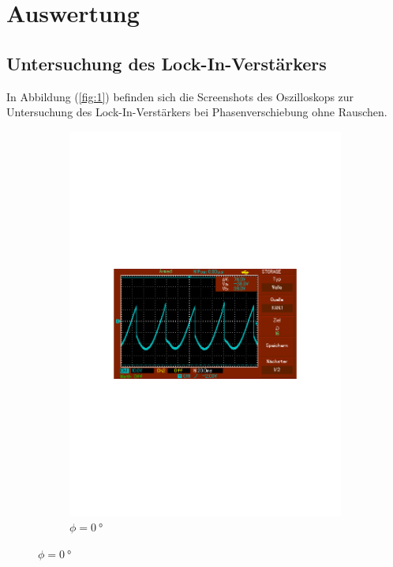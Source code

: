 \newpage
\section{Auswertung}
\subsection{Untersuchung des Lock-In-Verstärkers}
In Abbildung (\ref{fig:1}) befinden sich die Screenshots des Oszilloskops zur Untersuchung des Lock-In-Verstärkers bei Phasenverschiebung ohne Rauschen. 

\begin{figure}
  \centering
  \begin{subfigure}{0.3\textwidth}
      \centering
      \includegraphics[width=\textwidth]{Daten/noNoise/0.pdf}
      \caption{$\phi = \SI{0}{\degree}$}
      \label{fig:0}
  \end{subfigure}

\end{figure}
